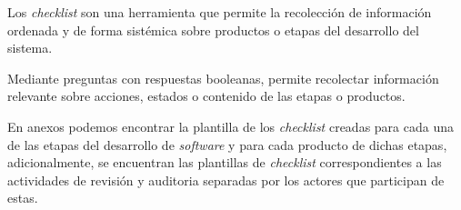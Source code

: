 Los \textit{checklist}  son una herramienta que permite la recolección de información ordenada y de forma sistémica sobre productos o etapas del desarrollo del sistema.

Mediante preguntas con respuestas booleanas, permite recolectar información relevante sobre acciones, estados o contenido de las etapas o productos. 

En anexos podemos encontrar la plantilla de los \textit{checklist} creadas para cada una de las etapas del desarrollo de \textit{software} y para cada producto de dichas etapas, adicionalmente, se encuentran las plantillas de \textit{checklist}  correspondientes a las actividades de revisión y auditoria separadas por los actores que participan de estas. 

